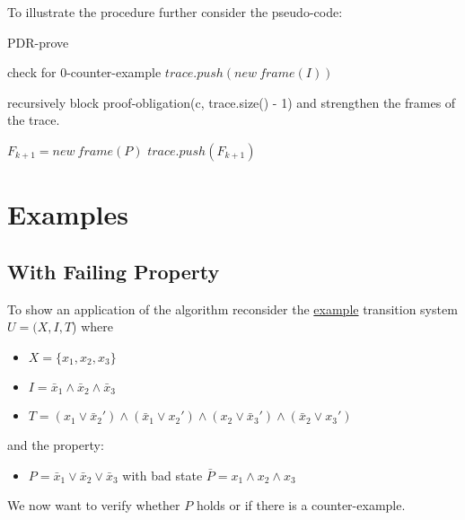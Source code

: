 \documentclass[11pt, a4paper, BCOR=10mm, ngerman, oneside]{scrbook}
\begin{document}
\pagebreak

To illustrate the procedure further consider the pseudo-code: \\

\begin{algorithm}[H] 
\caption{PDR-prove}
\begin{algorithmic}[1]
\State check for 0-counter-example
\State $trace.push(new\ frame(I))$
\Statex
\Loop

	\State recursively block proof-obligation(c, trace.size() - 1)
	\State and strengthen the frames of the trace.
	
	 
	\EndIf
	\EndWhile

	\Statex	
	
	\State $F_{k+1} = new\ frame(P)$
	\EndIf
\EndFor
	\EndIf
	\State $trace.push(F_{k+1})$

\EndLoop
\EndProcedure
\end{algorithmic}
\end{algorithm}

\section{Examples}
 
\subsection{With Failing Property} 
To show an application of the algorithm reconsider the \hyperref[ex1]{example} transition system $U = (X, I, T$) where \par
\begin{itemize}
\item $X = \{x_1, x_2, x_3\}$
\item $I = \bar x_1 \land \bar x_2 \land \bar x_3$
\item $T = (x_1 \lor \bar x_2' ) \land ( \bar x_1 \lor x_2') \land (x_2 \lor \bar x_3') \land ( \bar x_2 \lor x_3')$
\end{itemize}
and the property: 
\begin{itemize}
\item $P = \bar x_1 \lor \bar x_2 \lor \bar x_3$ with bad state $\bar P = x_1 \land x_2 \land x_3$ 
\end{itemize}
We now want to verify whether $P$ holds or if there is a counter-example. \\ \\
\end{document}
